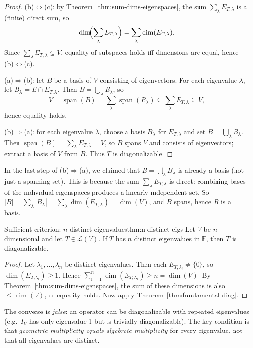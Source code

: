 \begin{proof}
(b)$\Leftrightarrow$(c): by Theorem~\ref{thm:sum-dims-eigenspaces}, the sum $\sum_{\lambda}E_{T,\lambda}$ is a (finite) direct sum,
so
\[
\dim\!\Bigl(\sum_{\lambda}E_{T,\lambda}\Bigr)=\sum_{\lambda}\dim(E_{T,\lambda}).
\]
Since $\sum_{\lambda}E_{T,\lambda}\subseteq V$, equality of subspaces holds iff dimensions are equal, hence (b)$\Leftrightarrow$(c).

(a)$\Rightarrow$(b): let $B$ be a basis of $V$ consisting of eigenvectors. For each eigenvalue $\lambda$, let $B_\lambda=B\cap E_{T,\lambda}$.
Then $B=\bigcup_\lambda B_\lambda$, so
\[
V=\operatorname{span}(B)=\sum_\lambda \operatorname{span}(B_\lambda)\subseteq \sum_\lambda E_{T,\lambda}\subseteq V,
\]
hence equality holds.

(b)$\Rightarrow$(a): for each eigenvalue $\lambda$, choose a basis $B_\lambda$ for $E_{T,\lambda}$ and set $B=\bigcup_\lambda B_\lambda$.
Then $\operatorname{span}(B)=\sum_\lambda E_{T,\lambda}=V$, so $B$ spans $V$ and consists of eigenvectors; extract a basis of $V$ from $B$.
Thus $T$ is diagonalizable.
\end{proof}

In the last step of (b)$\Rightarrow$(a), we claimed that $B=\bigcup_\lambda B_\lambda$ is already a basis (not just a spanning set).
This is because the sum $\sum_\lambda E_{T,\lambda}$ is direct: combining bases of the individual eigenspaces produces a linearly independent set.
So $|B|=\sum_\lambda |B_\lambda| = \sum_\lambda \dim(E_{T,\lambda}) = \dim(V)$, and $B$ spans, hence $B$ is a basis.

\begin{theorem}{Sufficient criterion: $n$ distinct eigenvalues}{thm:n-distinct-eigs}
Let $V$ be $n$-dimensional and let $T\in\mathcal{L}(V)$. If $T$ has $n$ distinct eigenvalues in $\mathbb{F}$, then $T$ is diagonalizable.
\end{theorem}

\begin{proof}
Let $\lambda_1,\dots,\lambda_n$ be distinct eigenvalues. Then each $E_{T,\lambda_i}\neq\{0\}$, so $\dim(E_{T,\lambda_i})\ge 1$.
Hence $\sum_{i=1}^n \dim(E_{T,\lambda_i})\ge n=\dim(V)$.
By Theorem~\ref{thm:sum-dims-eigenspaces}, the sum of these dimensions is also $\le \dim(V)$, so equality holds.
Now apply Theorem~\ref{thm:fundamental-diag}.
\end{proof}

The converse is \emph{false}: an operator can be diagonalizable with repeated eigenvalues (e.g.\ $I_V$ has only eigenvalue $1$ but is trivially diagonalizable).
The key condition is that \emph{geometric multiplicity equals algebraic multiplicity} for every eigenvalue, not that all eigenvalues are distinct.

